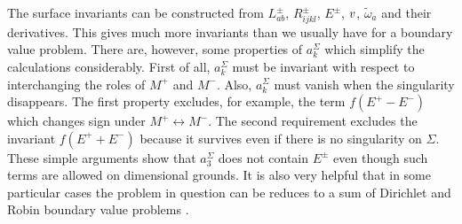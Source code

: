 The surface invariants can be constructed from $L_{ab}^\pm$,
$R_{ijkl}^\pm$, $E^\pm$, $v$, $\tilde\omega_a$ and their
derivatives. This gives much more invariants than we usually have
for a boundary value problem. There are, however, some properties
of $a_k^\Sigma$ which simplify the calculations considerably.
First of all, $a_k^\Sigma$ must be invariant with respect to
interchanging the roles of $M^+$ and $M^-$. Also, $a_k^\Sigma$
must vanish when the singularity disappears. The first property
excludes, for example, the term $f(E^+-E^-)$ which changes sign
under $M^+\leftrightarrow M^-$. The second requirement excludes
the invariant $f(E^++E^-)$ because it survives even if there is no
singularity on $\Sigma$. These simple arguments show that $a_3^\Sigma$
does not contain $E^\pm$ even though such terms are allowed on dimensional
grounds. It is also very helpful that in some particular cases the
problem in question can be reduces to a sum of Dirichlet and Robin
boundary value problems \cite{Bordag:1999ed,Gilkey:2001mj}.

